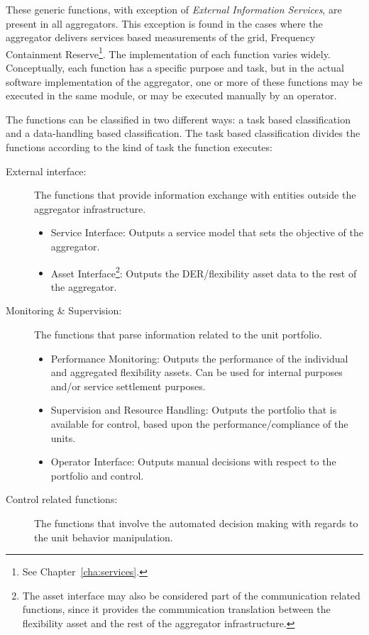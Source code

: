 These generic functions, with exception of \emph{External Information Services}, are present in all aggregators. This exception is found in the cases where the aggregator delivers services based measurements of the grid, \eg Frequency Containment Reserve\footnote{See Chapter~\ref{cha:services}.}. The implementation of each function varies widely. 
Conceptually, each function has a specific purpose and task, but in the actual software implementation of the aggregator, one or more of these functions may be executed in the same module, or may be executed manually by an operator.

The functions can be classified in two different ways: a task based classification and a data-handling based classification. The task based classification divides the functions according to the kind of task the function executes:
\begin{description}
	\item[External interface:] The functions that provide information exchange with entities outside the aggregator infrastructure.
		\begin{itemize}
			\item Service Interface: Outputs a service model that sets the objective of the aggregator.
			\item Asset Interface\footnote{The asset interface may also be considered part of the communication related functions, since it provides the communication translation between the flexibility asset and the rest of the aggregator infrastructure.}: Outputs the DER/flexibility asset data to the rest of the aggregator.
		\end{itemize}
	\item[Monitoring \& Supervision:] The functions that parse information related to the unit portfolio.
		\begin{itemize}
			\item Performance Monitoring: Outputs the performance of the individual and aggregated flexibility assets. Can be used for internal purposes and/or service settlement purposes.
			\item Supervision and Resource Handling: Outputs the portfolio that is available for control, based upon the performance/compliance of the units.
			\item Operator Interface: Outputs manual decisions with respect to the portfolio and control.
		\end{itemize}
	\item[Control related functions:] The functions that involve the automated decision making with regards to the unit behavior manipulation.

\end{description}
